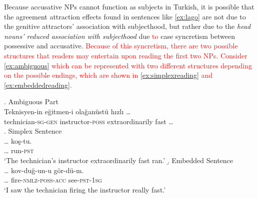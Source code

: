 \documentclass[apacite,linguex]{glossa}\usepackage[]{graphicx}\usepackage[]{color}
\newcommand{\revise}[1]{\textcolor{red}{#1}}
\begin{document}
Because accusative NPs cannot function as subjects in Turkish, it is possible that the agreement attraction effects found in sentences like \ref{ex:lago} are not due to the genitive attractors' association with subjecthood, but rather due to the \textit{head nouns' reduced association with subjecthood} due \revise{to} case syncretism between possessive and accusative. \revise{Because of this syncretism, there are two possible structures that readers may entertain upon reading the first two NPs. Consider \ref{ex:ambiguous} which can be represented with two different structures depending on the possible endings, which are shown in \ref{ex:simplexreading} and \ref{ex:embeddedreading}.} 

{\color{red}
\ex. Ambiguous Part \label{ex:ambiguous}\\
\gll Teknisyen-in e\u{g}itmen-i ola\u{g}an{\"u}st{\"u} h{\i}zl{\i} \ldots \\
technician-\textsc{sg}-\textsc{gen} instructor-\textsc{poss} extraordinarily fast \ldots \\
  \a. Simplex Sentence \label{ex:simplexreading} \\
  \gll \ldots{} ko\c{s}-tu.\\
  \ldots{} run-\textsc{pst}\\
  \glt `The technician's instructor extraordinarily fast ran.'
  \b. Embedded Sentence \label{ex:embeddedreading}\\
  \gll \ldots{} kov-du\u{g}-un-u g\"{o}r-d\"{u}-m.\\
  \ldots{} fire-\textsc{nmlz}-\textsc{poss}-\textsc{acc} see-\textsc{pst}-\textsc{1sg}\\
  \glt `I saw the technician firing the instructor really fast.'

}
\end{document}
